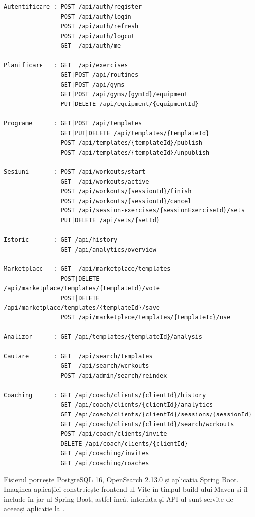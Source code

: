 \begin{lstlisting}
Autentificare : POST /api/auth/register
                POST /api/auth/login
                POST /api/auth/refresh
                POST /api/auth/logout
                GET  /api/auth/me

Planificare   : GET  /api/exercises
                GET|POST /api/routines
                GET|POST /api/gyms
                GET|POST /api/gyms/{gymId}/equipment
                PUT|DELETE /api/equipment/{equipmentId}

Programe      : GET|POST /api/templates
                GET|PUT|DELETE /api/templates/{templateId}
                POST /api/templates/{templateId}/publish
                POST /api/templates/{templateId}/unpublish

Sesiuni       : POST /api/workouts/start
                GET  /api/workouts/active
                POST /api/workouts/{sessionId}/finish
                POST /api/workouts/{sessionId}/cancel
                POST /api/session-exercises/{sessionExerciseId}/sets
                PUT|DELETE /api/sets/{setId}

Istoric       : GET /api/history
                GET /api/analytics/overview

Marketplace   : GET  /api/marketplace/templates
                POST|DELETE /api/marketplace/templates/{templateId}/vote
                POST|DELETE /api/marketplace/templates/{templateId}/save
                POST /api/marketplace/templates/{templateId}/use

Analizor      : GET /api/templates/{templateId}/analysis

Cautare       : GET  /api/search/templates
                GET  /api/search/workouts
                POST /api/admin/search/reindex

Coaching      : GET /api/coach/clients/{clientId}/history
                GET /api/coach/clients/{clientId}/analytics
                GET /api/coach/clients/{clientId}/sessions/{sessionId}
                GET /api/coach/clients/{clientId}/search/workouts
                POST /api/coach/clients/invite
                DELETE /api/coach/clients/{clientId}
                GET /api/coaching/invites
                GET /api/coaching/coaches
\end{lstlisting}


Fișierul  pornește PostgreSQL 16, OpenSearch 2.13.0 și aplicația Spring Boot.
Imaginea aplicației construiește frontend-ul Vite în timpul build-ului Maven și îl include în jar-ul
Spring Boot, astfel încât interfața și API-ul sunt servite de aceeași aplicație la
.

